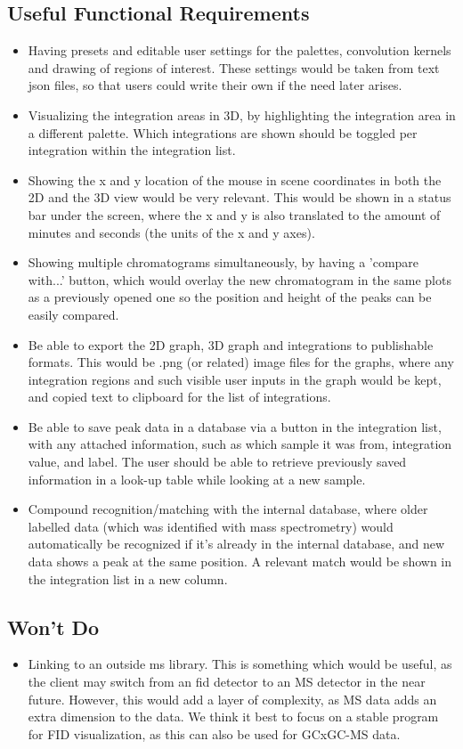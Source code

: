 \documentclass{article}
\begin{document}
\subsection*{Useful Functional Requirements}
\begin{itemize}
    \item Having presets and editable user settings for the palettes, convolution kernels and drawing of regions of interest. These settings would be taken from text json files, so that users could write their own if the need later arises.
    \item Visualizing the integration areas in 3D, by highlighting the integration area in a different palette. Which integrations are shown should be toggled per integration within the integration list.
    \item Showing the x and y location of the mouse in scene coordinates in both the 2D and the 3D view would be very relevant. This would be shown in a status bar under the screen, where the x and y is also translated to the amount of minutes and seconds (the units of the x and y axes).
    \item Showing multiple chromatograms simultaneously, by having a 'compare with...' button, which would overlay the new chromatogram in the same plots as a previously opened one so the position and height of the peaks can be easily compared. 
    \item Be able to export the 2D graph, 3D graph and integrations to publishable formats. This would be .png (or related) image files for the graphs, where any integration regions and such visible user inputs in the graph would be kept, and copied text to clipboard for the list of integrations.
    \item Be able to save peak data in a database via a button in the integration list, with any attached information, such as which sample it was from, integration value, and label. The user should be able to retrieve previously saved information in a look-up table while looking at a new sample.
	\item Compound recognition/matching with the internal database, where older labelled data (which was identified with mass spectrometry) would automatically be recognized if it's already in the internal database, and new data shows a peak at the same position. A relevant match would be shown in the integration list in a new column.
\end{itemize}
\subsection*{Won't Do}
\begin{itemize}
	\item Linking to an outside \acrlong{ms}  library. This is something which would be useful, as the client may switch from an \acrfull{fid} detector to an MS detector in the near future. However, this would add a layer of complexity, as MS data adds an extra dimension to the data. We think it best to focus on a stable program for FID visualization, as this can also be used for GCxGC-MS data. 
\end{itemize}
\end{document}
